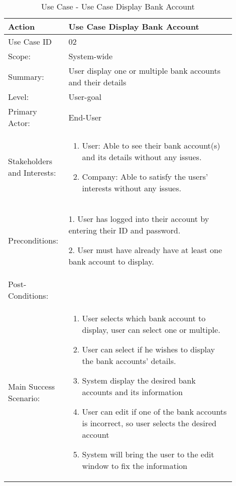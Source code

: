 \documentclass{article}
\newcounter{use case ID}
\newcommand\tabularhead[1]{
\begin{table}[ht]
    \addtocounter{use case ID}{1}
    \caption{Use Case \arabic{use case ID} - #1}
    \vspace{0.2cm}
    \begin{tabular}{|p{0.2\linewidth}|p{0.70\linewidth}|}
    \hline
        \textbf{Action} & \textbf{#1} \\
        \hline}
\newcommand\addrow[2]{#1 & #2\\ \hline}
\newcommand\addmulrow[2]{ \begin{minipage}[t][][t]{2.5cm}#1\end{minipage}
        &\begin{minipage}[t][][t]{11cm}
        \begin{enumerate}[itemsep=-1ex] #2   \end{enumerate}
    \end{minipage}\vfill\\ \hline}
\newenvironment{usecase}{\tabularhead}
{\hline\end{tabular}\end{table}}
\begin{document}
\begin{usecase}{Use Case Display Bank Account}

\addrow{Use Case ID}{02}
\addrow{Scope:}{System-wide}

\addrow{Summary:}{User display one or multiple bank accounts and their details}

\addrow{Level:}{User-goal}

\addrow{Primary Actor:}{End-User}

\addmulrow{Stakeholders and Interests:}{
	\item User: Able to see their bank account(s) and its details without any issues.
	\item Company: Able to satisfy the users' interests without any issues.
}

\addrow{Preconditions:}{
    \item [1.]User has logged into their account by entering their ID and password.
    \item [2.]User must have already have at least one bank account to display.
} 

\addrow{Post-Conditions:}{}


\addmulrow{Main Success Scenario:}{
	\item User selects which bank account to display, user can select one or multiple.
	\item User can select if he wishes to display the bank accounts' details.
	\item System display the desired bank accounts and its information
	\item User can edit if one of the bank accounts is incorrect, so user selects the desired account
	\item System will bring the user to the edit window to fix the information
}


\end{usecase}
\end{document}
